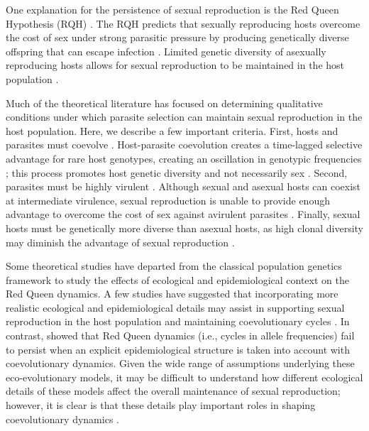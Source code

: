 \documentclass{article}\usepackage[]{graphicx}\usepackage[]{color}
\begin{document}
One explanation for the persistence of sexual reproduction is the Red Queen Hypothesis (RQH) \citep{bell1982masterpiece}.
The RQH predicts that sexually reproducing hosts overcome the cost of sex under strong parasitic pressure by producing genetically diverse offspring that can escape infection \citep{jbs1949disease, jaenike1978hypothesis, hamilton1980sex, hamilton1990sexual}.
Limited genetic diversity of asexually reproducing hosts allows for sexual reproduction to be maintained in the host population \citep{ashby2015diversity}.

Much of the theoretical literature has focused on determining qualitative conditions under which parasite selection can maintain sexual reproduction in the host population.
Here, we describe a few important criteria.
First, hosts and parasites must coevolve \citep{bell1982masterpiece}.
Host-parasite coevolution creates a time-lagged selective advantage for rare host genotypes, creating an oscillation in genotypic frequencies \citep{jaenike1978hypothesis, hamilton1980sex, agrawal2001parasites}; this process promotes host genetic diversity and not necessarily sex \citep{king2009geographic, dagan2013clonal, ashby2015diversity}.
Second, parasites must be highly virulent \citep{may1983epidemiology}.
Although sexual and asexual hosts can coexist at intermediate virulence, sexual reproduction is unable to provide enough advantage to overcome the cost of sex against avirulent parasites \citep{howard1994parasitism}.
Finally, sexual hosts must be genetically more diverse than asexual hosts, as high clonal diversity may diminish the advantage of sexual reproduction \citep{lively1994selection, lively2010review, ashby2015diversity}.

Some theoretical studies have departed from the classical population genetics framework to study the effects of ecological and epidemiological context on the Red Queen dynamics.
A few studies have suggested that incorporating more realistic ecological and epidemiological details may assist in supporting sexual reproduction in the host population \citep{lively2009maintenance, lively2010epidemiological} and maintaining coevolutionary cycles \citep{ashby2014parasitic}.
In contrast, \cite{macpherson2018joint} showed that Red Queen dynamics (i.e., cycles in allele frequencies) fail to persist when an explicit epidemiological structure is taken into account with coevolutionary dynamics.
Given the wide range of assumptions underlying these eco-evolutionary models, it may be difficult to understand how different ecological details of these models affect the overall maintenance of sexual reproduction;
however, it is clear is that these details play important roles in shaping coevolutionary dynamics \citep{song2015host, haafke2016eco, ashby2019understanding}.
\end{document}
